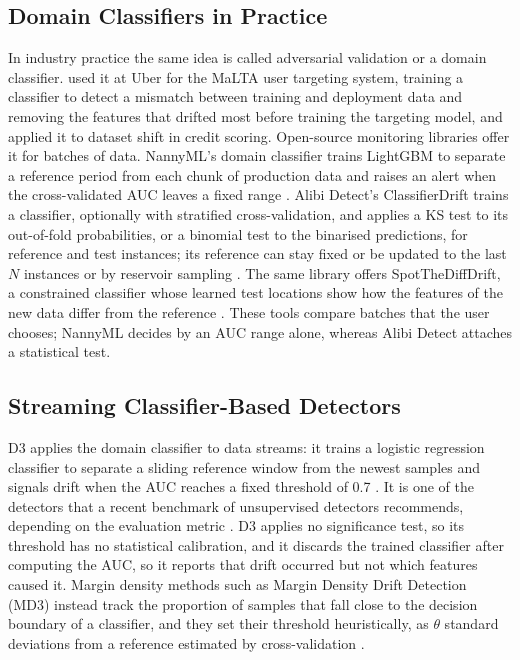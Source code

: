 \subsection{Domain Classifiers in Practice}
In industry practice the same idea is called adversarial validation or a domain classifier. \citet{Pan2020} used it at Uber for the MaLTA user targeting system, training a classifier to detect a mismatch between training and deployment data and removing the features that drifted most before training the targeting model, and \citet{Qian2021} applied it to dataset shift in credit scoring. Open-source monitoring libraries offer it for batches of data. NannyML's domain classifier trains LightGBM to separate a reference period from each chunk of production data and raises an alert when the cross-validated AUC leaves a fixed range \citep{NannyML}. Alibi Detect's ClassifierDrift trains a classifier, optionally with stratified cross-validation, and applies a KS test to its out-of-fold probabilities, or a binomial test to the binarised predictions, for reference and test instances; its reference can stay fixed or be updated to the last $N$ instances or by reservoir sampling \citep{AlibiDetect}. The same library offers SpotTheDiffDrift, a constrained classifier whose learned test locations show how the features of the new data differ from the reference \citep{AlibiDetect}. These tools compare batches that the user chooses; NannyML decides by an AUC range alone, whereas Alibi Detect attaches a statistical test.

\subsection{Streaming Classifier-Based Detectors}
D3 applies the domain classifier to data streams: it trains a logistic regression classifier to separate a sliding reference window from the newest samples and signals drift when the AUC reaches a fixed threshold of 0.7 \citep{Gozuacik2019}. It is one of the detectors that a recent benchmark of unsupervised detectors recommends, depending on the evaluation metric \citep{Lukats2024}. D3 applies no significance test, so its threshold has no statistical calibration, and it discards the trained classifier after computing the AUC, so it reports that drift occurred but not which features caused it. Margin density methods such as Margin Density Drift Detection (MD3) instead track the proportion of samples that fall close to the decision boundary of a classifier, and they set their threshold heuristically, as $\theta$ standard deviations from a reference estimated by cross-validation \citep{Sethi2017}.

